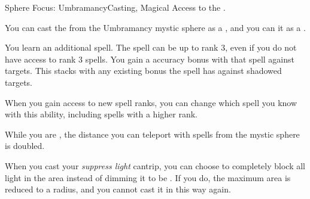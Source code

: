   \begin{magicalfeat}{Sphere Focus: Umbramancy}{Casting, Magical}
    \featpre Access to the  .

     You can cast the   from the Umbramancy mystic sphere as a , and you can  it as a .

     You learn an additional spell.
    The spell can be up to rank 3, even if you do not have access to rank 3 spells.
    You gain a  accuracy bonus with that spell against  targets.
    This stacks with any existing bonus the spell has against shadowed targets.

    When you gain access to new spell ranks, you can change which spell you know with this ability, including spells with a higher rank.

     While you are , the distance you can teleport with spells from the  mystic sphere is doubled.

     When you cast your \textit{suppress light} cantrip, you can choose to completely block all light in the area instead of dimming it to be .
    If you do, the maximum area is reduced to a \medarea radius, and you  cannot cast it in this way again.
  \end{magicalfeat}

